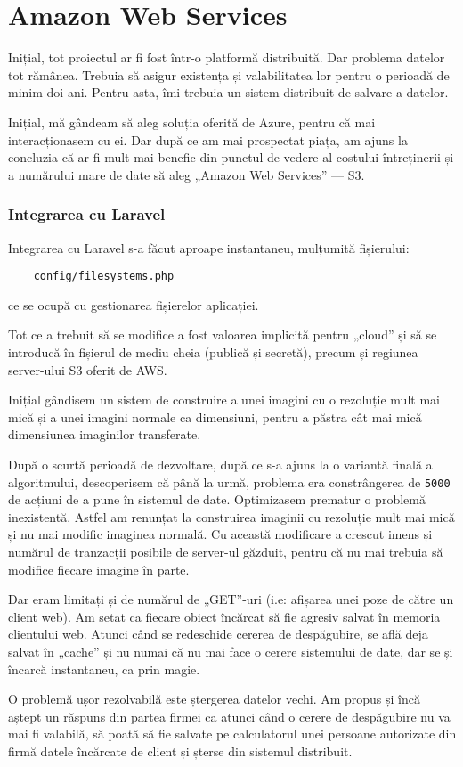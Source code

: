 \section{Amazon Web Services}

	Inițial, tot proiectul ar fi fost într-o platformă distribuită.
	Dar problema datelor tot rămânea.
	Trebuia să asigur existența și valabilitatea lor pentru o perioadă de minim doi ani.
	Pentru asta, îmi trebuia un sistem distribuit de salvare a datelor.

	Inițial, mă gândeam să aleg soluția oferită de Azure, pentru că mai interacționasem cu ei.
	Dar după ce am mai prospectat piața, am ajuns la concluzia că ar fi mult mai benefic din punctul de vedere al costului întreținerii și a numărului mare de date să aleg „Amazon Web Services” --- S3.

	\subsubsection{Integrarea cu Laravel}

	Integrarea cu Laravel s-a făcut aproape instantaneu, mulțumită fișierului:
	\begin{verbatim}
	config/filesystems.php
	\end{verbatim}
	ce se ocupă cu gestionarea fișierelor aplicației.

	Tot ce a trebuit să se modifice a fost valoarea implicită pentru „cloud” și să se introducă în fișierul de mediu cheia (publică și secretă), precum și regiunea server-ului S3 oferit de AWS.

	Inițial gândisem un sistem de construire a unei imagini cu o rezoluție mult mai mică și a unei imagini normale ca dimensiuni, pentru a păstra cât mai mică dimensiunea imaginilor transferate.

	După o scurtă perioadă de dezvoltare, după ce s-a ajuns la o variantă finală a algoritmului, descoperisem că până la urmă, problema era constrângerea de \verb|5000| de acțiuni de a pune în sistemul de date.
	Optimizasem prematur o problemă inexistentă.
	Astfel am renunțat la construirea imaginii cu rezoluție mult mai mică și nu mai modific imaginea normală.
	Cu această modificare a crescut imens și numărul de tranzacții posibile de server-ul găzduit, pentru că nu mai trebuia să modifice fiecare imagine în parte.

	Dar eram limitați și de numărul de „GET”-uri (i.e: afișarea unei poze de către un client web).
	Am setat ca fiecare obiect încărcat să fie agresiv salvat în memoria clientului web.
	Atunci când se redeschide cererea de despăgubire, se află deja salvat în „cache” și nu numai că nu mai face o cerere sistemului de date, dar se și încarcă instantaneu, ca prin magie.

	O problemă ușor rezolvabilă este ștergerea datelor vechi.
	Am propus și încă aștept un răspuns din partea firmei ca atunci când o cerere de despăgubire nu va mai fi valabilă, să poată să fie salvate pe calculatorul unei persoane autorizate din firmă datele încărcate de client și șterse din sistemul distribuit.
